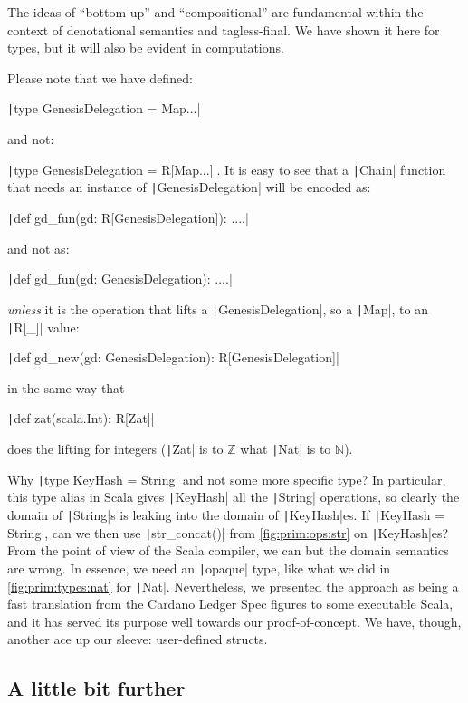 \documentclass[11pt]{article}
\renewcommand{\vref}[1]{\autoref{#1} \vpageref{#1}}{}
\newcommand{\ScalaI}[1]{\texttt|#1|}
\begin{document}
\noindent The ideas of ``bottom-up'' and ``compositional'' are fundamental within the context of denotational semantics and tagless-final. We have shown it here for types, but it will also be evident in computations.

Please note that we have defined:

\ScalaI{type GenesisDelegation = Map...}

\noindent and not:

\ScalaI{type GenesisDelegation = R[Map...]}. It is easy to see that a \ScalaI{Chain} function that needs an instance of \ScalaI{GenesisDelegation} will be encoded as:

\ScalaI{def gd_fun(gd: R[GenesisDelegation]): ....}

\noindent and not as:

\ScalaI{def gd_fun(gd: GenesisDelegation): ....}

\noindent \textit{unless} it is the operation that lifts a \ScalaI{GenesisDelegation}, so a \ScalaI{Map}, to an \ScalaI{R[_]} value:

\ScalaI{def gd_new(gd: GenesisDelegation): R[GenesisDelegation]}

\noindent in the same way that

\ScalaI{def zat(scala.Int): R[Zat]}

\noindent does the lifting for integers (\ScalaI{Zat} is to $\mathbb{Z}$ what \ScalaI{Nat} is to $\mathbb{N}$).

Why \ScalaI{type KeyHash = String} and not some more specific type? In particular, this type alias in Scala gives \ScalaI{KeyHash} all the \ScalaI{String} operations, so clearly the domain of \ScalaI{String}s is leaking into the domain of \ScalaI{KeyHash}es. If \ScalaI{KeyHash = String}, can we then use \ScalaI{str_concat()} from \autoref{fig:prim:ops:str} on \ScalaI{KeyHash}es? From the point of view of the Scala compiler, we can but the domain semantics are wrong. In essence, we need an \ScalaI{opaque} type, like what we did in \vref{fig:prim:types:nat} for \ScalaI{Nat}. Nevertheless, we presented the approach as being a fast translation from the Cardano Ledger Spec figures to some executable Scala, and it has served its purpose well towards our proof-of-concept. We have, though, another ace up our sleeve: user-defined structs.

\subsection{A little bit further}
\label{sec:chain:further}
\end{document}
